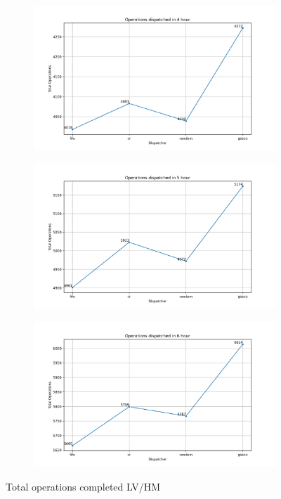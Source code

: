 \begin{figure}[ht]
\begin{subfigure}{0.32\textwidth}
	\end{subfigure}
	\begin{subfigure}{0.32\textwidth}
		\includegraphics[width=\textwidth]{LVHM/total_operations_14400s.png}
	\end{subfigure}\hfill
	\begin{subfigure}{0.32\textwidth}
		\includegraphics[width=\textwidth]{LVHM/total_operations_18000s.png}
	\end{subfigure}\hfill
	\begin{subfigure}{0.32\textwidth}
		\includegraphics[width=\textwidth]{LVHM/total_operations_21600s.png}
	\end{subfigure}
	\caption{Total operations completed LV/HM}
	\label{fig:totalopsLVHM}
\end{figure}